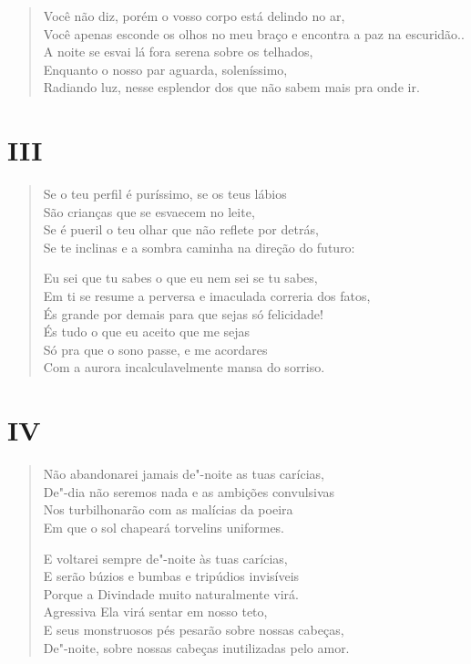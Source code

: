 {\begin{verse}
Você não diz, porém o vosso corpo está delindo no ar,\\
Você apenas esconde os olhos no meu braço e encontra a paz na escuridão..\\
A noite se esvai lá fora serena sobre os telhados,\\
Enquanto o nosso par aguarda, soleníssimo,\\
Radiando luz, nesse esplendor dos que não sabem mais pra onde ir.
\end{verse}

\medskip
\section*{III}

\begin{verse}
Se o teu perfil é puríssimo, se os teus lábios\\
São crianças que se esvaecem no leite,\\
Se é pueril o teu olhar que não reflete por detrás,\\
Se te inclinas e a sombra caminha na direção do futuro:

Eu sei que tu sabes o que eu nem sei se tu sabes,\\
Em ti se resume a perversa e imaculada correria dos fatos,\\
És grande por demais para que sejas só felicidade!\\
És tudo o que eu aceito que me sejas\\
Só pra que o sono passe, e me acordares\\
Com a aurora incalculavelmente mansa do sorriso.
\end{verse}

\medskip
\section*{IV}

\begin{verse}
Não abandonarei jamais de"-noite as tuas carícias,\\
De"-dia não seremos nada e as ambições convulsivas\\
Nos turbilhonarão com as malícias da poeira\\
Em que o sol chapeará torvelins uniformes.

E voltarei sempre de"-noite às tuas carícias,\\
E serão búzios e bumbas e tripúdios invisíveis\\
Porque a Divindade muito naturalmente virá.\\
Agressiva Ela virá sentar em nosso teto,\\
E seus monstruosos pés pesarão sobre nossas cabeças,\\
De"-noite, sobre nossas cabeças inutilizadas pelo amor.
\end{verse}

}
